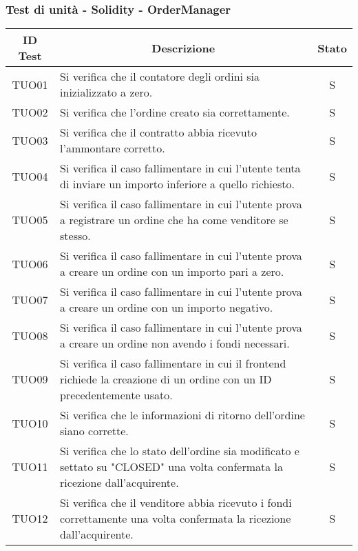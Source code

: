 \subsubsection{Test di unità - Solidity - OrderManager}\label{subsubsection:TUO}
\begin{table}[H]
  \centering
  \renewcommand{\arraystretch}{1.8}
  \begin{tabular}{c|p{10cm}|c}
    \rowcolor[HTML]{125E28}
    \color[HTML]{FFFFFF}\textbf{ID Test}
          & \multicolumn{1}{c}{\color[HTML]{FFFFFF}\textbf{Descrizione}}
          & \color[HTML]{FFFFFF}\textbf{Stato}                                                                                                \\
    \hline
    TUO01 & Si verifica che il contatore degli ordini sia inizializzato a zero.                                                           & S \\
    TUO02 & Si verifica che l'ordine creato sia correttamente.                                                                            & S \\
    TUO03 & Si verifica che il contratto abbia ricevuto l'ammontare corretto.                                                             & S \\
    TUO04 & Si verifica il caso fallimentare in cui l'utente tenta di inviare un importo inferiore a quello richiesto.                    & S \\
    TUO05 & Si verifica il caso fallimentare in cui l'utente prova a registrare un ordine che ha come venditore se stesso.                & S \\
    TUO06 & Si verifica il caso fallimentare in cui l'utente prova a creare un ordine con un importo pari a zero.                         & S \\
    TUO07 & Si verifica il caso fallimentare in cui l'utente prova a creare un ordine con un importo negativo.                            & S \\
    TUO08 & Si verifica il caso fallimentare in cui l'utente prova a creare un ordine non avendo i fondi necessari.                       & S \\
    TUO09 & Si verifica il caso fallimentare in cui il frontend\glo{} richiede la creazione di un ordine con un ID precedentemente usato. & S \\
    TUO10 & Si verifica che le informazioni di ritorno dell'ordine siano corrette.                                                        & S \\
    TUO11 & Si verifica che lo stato dell'ordine sia modificato e settato su "CLOSED" una volta confermata la ricezione dall'acquirente.  & S \\
    TUO12 & Si verifica che il venditore abbia ricevuto i fondi correttamente una volta confermata la ricezione dall'acquirente.          & S \\
  \end{tabular}
\end{table}
